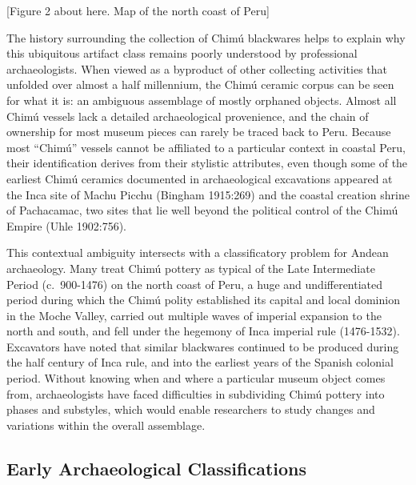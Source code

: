 \documentclass[]{interact}
\theoremstyle{plain}%
\theoremstyle{definition}
\theoremstyle{remark}
\begin{document}
{[}Figure 2 about here. Map of the north coast of Peru{]}

The history surrounding the collection of Chimú blackwares helps to
explain why this ubiquitous artifact class remains poorly understood by
professional archaeologists. When viewed as a byproduct of other
collecting activities that unfolded over almost a half millennium, the
Chimú ceramic corpus can be seen for what it is: an ambiguous assemblage
of mostly orphaned objects. Almost all Chimú vessels lack a detailed
archaeological provenience, and the chain of ownership for most museum
pieces can rarely be traced back to Peru. Because most ``Chimú'' vessels
cannot be affiliated to a particular context in coastal Peru, their
identification derives from their stylistic attributes, even though some
of the earliest Chimú ceramics documented in archaeological excavations
appeared at the Inca site of Machu Picchu (Bingham 1915:269) and the
coastal creation shrine of Pachacamac, two sites that lie well beyond
the political control of the Chimú Empire (Uhle 1902:756).

This contextual ambiguity intersects with a classificatory problem for
Andean archaeology. Many treat Chimú pottery as typical of the Late
Intermediate Period (c.~900-1476) on the north coast of Peru, a huge and
undifferentiated period during which the Chimú polity established its
capital and local dominion in the Moche Valley, carried out multiple
waves of imperial expansion to the north and south, and fell under the
hegemony of Inca imperial rule (1476-1532). Excavators have noted that
similar blackwares continued to be produced during the half century of
Inca rule, and into the earliest years of the Spanish colonial period.
Without knowing when and where a particular museum object comes from,
archaeologists have faced difficulties in subdividing Chimú pottery into
phases and substyles, which would enable researchers to study changes
and variations within the overall assemblage.

\hypertarget{early-archaeological-classifications}{%
\subsection{Early Archaeological
Classifications}\label{early-archaeological-classifications}}
\end{document}
